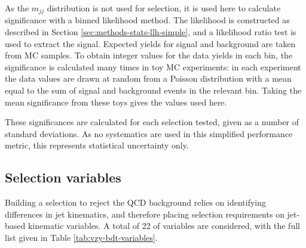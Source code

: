 As the $m_{jj}$ distribution is not used for selection, it is used here to
calculate significance with a binned likelihood method.
The likelihood is
constructed as described in Section \ref{sec:methods-stats-llh-simple}, and a
likelihood ratio test is used to extract the signal. Expected yields for signal
and background are taken from \ac{MC} samples.
To obtain integer values for the data yields in each bin, the significance is
calculated many times in toy \ac{MC} experiments: in each experiment the data
values are drawn at random from a Poisson distribution with a mean equal to the
sum of signal and background events in the relevant bin. Taking the mean
significance from these toys gives the values used here.

These significances are calculated for each selection tested, given as a number
of standard deviations. As no systematics are used in this simplified
performance metric, this represents statistical uncertainty only.

\subsection{Selection variables}

Building a selection to reject the \ac{QCD} \Zy background relies on identifying
differences in jet kinematics, and therefore placing selection requirements on
jet-based kinematic variables. A total of 22 of variables are considered, with
the full list given in Table \ref{tab:vzy-bdt-variables}.

\newcommand\ptbalance{\ensuremath{p_T^\text{balance}}\xspace}


